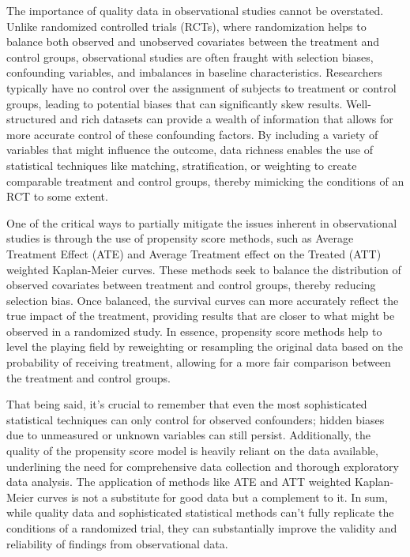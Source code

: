 The importance of quality data in observational studies cannot be overstated. Unlike randomized controlled trials (RCTs), where randomization helps to balance both observed and unobserved covariates between the treatment and control groups, observational studies are often fraught with selection biases, confounding variables, and imbalances in baseline characteristics. Researchers typically have no control over the assignment of subjects to treatment or control groups, leading to potential biases that can significantly skew results. Well-structured and rich datasets can provide a wealth of information that allows for more accurate control of these confounding factors. By including a variety of variables that might influence the outcome, data richness enables the use of statistical techniques like matching, stratification, or weighting to create comparable treatment and control groups, thereby mimicking the conditions of an RCT to some extent.

One of the critical ways to partially mitigate the issues inherent in observational studies is through the use of propensity score methods, such as Average Treatment Effect (ATE) and Average Treatment effect on the Treated (ATT) weighted Kaplan-Meier curves. These methods seek to balance the distribution of observed covariates between treatment and control groups, thereby reducing selection bias. Once balanced, the survival curves can more accurately reflect the true impact of the treatment, providing results that are closer to what might be observed in a randomized study. In essence, propensity score methods help to level the playing field by reweighting or resampling the original data based on the probability of receiving treatment, allowing for a more fair comparison between the treatment and control groups.

That being said, it's crucial to remember that even the most sophisticated statistical techniques can only control for observed confounders; hidden biases due to unmeasured or unknown variables can still persist. Additionally, the quality of the propensity score model is heavily reliant on the data available, underlining the need for comprehensive data collection and thorough exploratory data analysis. The application of methods like ATE and ATT weighted Kaplan-Meier curves is not a substitute for good data but a complement to it. In sum, while quality data and sophisticated statistical methods can't fully replicate the conditions of a randomized trial, they can substantially improve the validity and reliability of findings from observational data.


